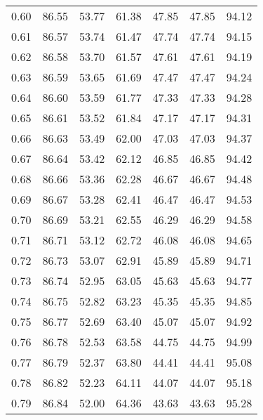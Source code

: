 \begin{tabular}{|c|c|c|c|c|c|c|}
      0.60 &     86.55 &     53.77 &      61.38 &   47.85 &      47.85 &         94.12 \\
      0.61 &     86.57 &     53.74 &      61.47 &   47.74 &      47.74 &         94.15 \\
      0.62 &     86.58 &     53.70 &      61.57 &   47.61 &      47.61 &         94.19 \\
      0.63 &     86.59 &     53.65 &      61.69 &   47.47 &      47.47 &         94.24 \\
      0.64 &     86.60 &     53.59 &      61.77 &   47.33 &      47.33 &         94.28 \\
      0.65 &     86.61 &     53.52 &      61.84 &   47.17 &      47.17 &         94.31 \\
      0.66 &     86.63 &     53.49 &      62.00 &   47.03 &      47.03 &         94.37 \\
      0.67 &     86.64 &     53.42 &      62.12 &   46.85 &      46.85 &         94.42 \\
      0.68 &     86.66 &     53.36 &      62.28 &   46.67 &      46.67 &         94.48 \\
      0.69 &     86.67 &     53.28 &      62.41 &   46.47 &      46.47 &         94.53 \\
      0.70 &     86.69 &     53.21 &      62.55 &   46.29 &      46.29 &         94.58 \\
      0.71 &     86.71 &     53.12 &      62.72 &   46.08 &      46.08 &         94.65 \\
      0.72 &     86.73 &     53.07 &      62.91 &   45.89 &      45.89 &         94.71 \\
      0.73 &     86.74 &     52.95 &      63.05 &   45.63 &      45.63 &         94.77 \\
      0.74 &     86.75 &     52.82 &      63.23 &   45.35 &      45.35 &         94.85 \\
      0.75 &     86.77 &     52.69 &      63.40 &   45.07 &      45.07 &         94.92 \\
      0.76 &     86.78 &     52.53 &      63.58 &   44.75 &      44.75 &         94.99 \\
      0.77 &     86.79 &     52.37 &      63.80 &   44.41 &      44.41 &         95.08 \\
      0.78 &     86.82 &     52.23 &      64.11 &   44.07 &      44.07 &         95.18 \\
      0.79 &     86.84 &     52.00 &      64.36 &   43.63 &      43.63 &         95.28 \\

\end{tabular}
